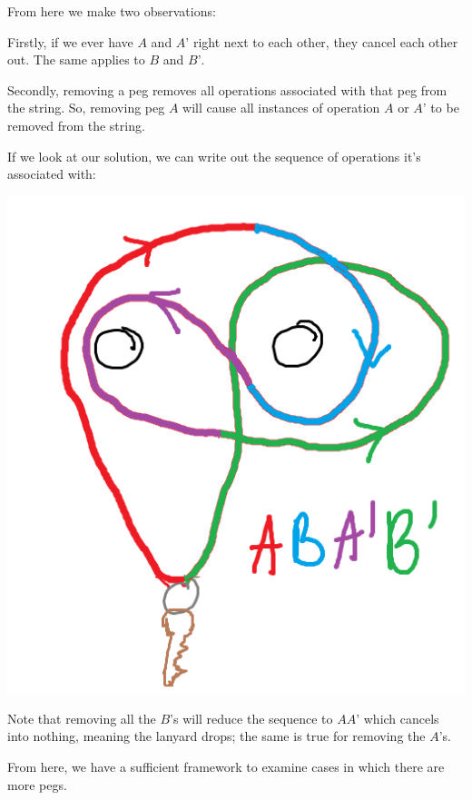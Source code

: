 \documentclass{article}
\begin{document}
From here we make two observations:

Firstly, if we ever have $A$ and $A’$ right next to each other, they cancel each other out. The same applies to $B$ and $B’$.


Secondly, removing a peg removes all operations associated with that peg from the string. So, removing peg $A$ will cause all instances of operation $A$ or $A’$ to be removed from the string. 

If we look at our solution, we can write out the sequence of operations it’s associated with: 

\begin{center}
    \includegraphics[scale=0.4]{images/lanyard6.png}
\end{center}

Note that removing all the $B$’s will reduce the sequence to $AA’$ which cancels into nothing, meaning the lanyard drops; the same is true for removing the $A$’s.

From here, we have a sufficient framework to examine cases in which there are more pegs.
\end{document}
